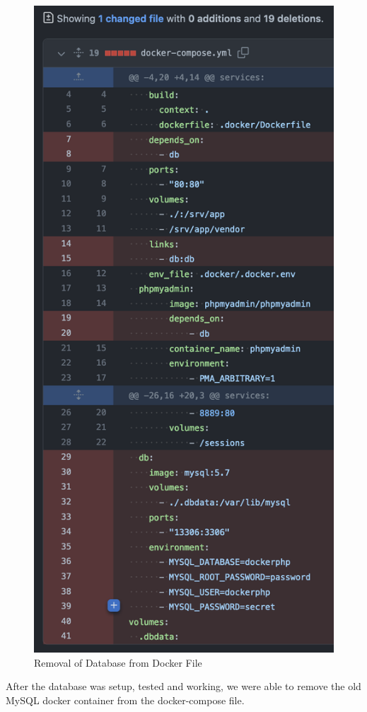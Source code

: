 \begin{figure}[!htbp]
    \centering
    \includegraphics[width=\textwidth]{resources/rds/docker.png}
    \caption{Removal of Database from Docker File}
    \label{fig:rm-docker-compose}
\end{figure}

After the database was setup, tested and working, we were able to remove the old MySQL docker container from the docker-compose file.
